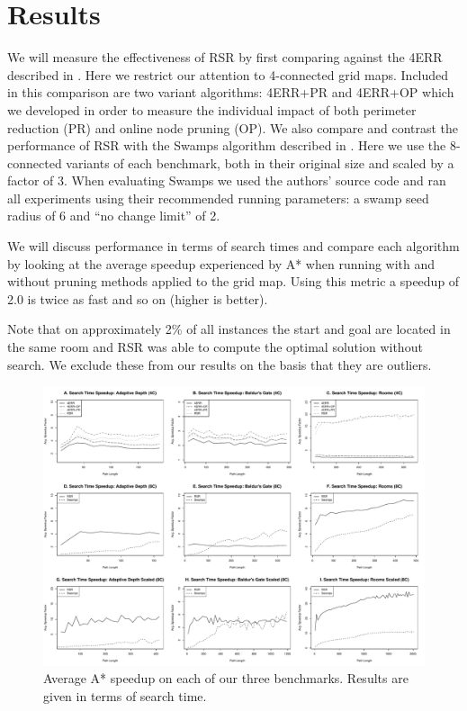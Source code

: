 \section{Results}
\label{sec-results}
We will measure the effectiveness of RSR by first comparing against the 4ERR
described in \cite{harabor10}. Here we restrict our attention to 4-connected
grid maps. Included in this comparison are two variant algorithms: 4ERR+PR and 
4ERR+OP which we developed in order to measure the individual impact of both
perimeter reduction (PR) and online node pruning (OP).
We also compare and contrast the performance of RSR
with the Swamps algorithm described in \cite{pochter10}.
Here we use the 8-connected variants of each benchmark, both in their original 
size and scaled by a factor of 3.
When evaluating Swamps we used the authors'
source code and ran all experiments using their recommended running parameters:
a swamp seed radius of 6 and ``no change limit'' of 2.  
\par 
We will discuss performance in terms of search times and compare each algorithm
by looking at the average speedup experienced by A* when running with and
without pruning methods applied to the grid map.  Using this metric a speedup of
2.0 is twice as fast and so on (higher is better).
\par
Note that on approximately 2\% of all instances the start and goal are located 
in the same room and RSR was able to compute the optimal solution without
search.
We exclude these from our results on the basis that they are 
outliers. 
\begin{figure}[t]
       \begin{center}
                       \includegraphics[width=1.90\columnwidth, trim = 10mm 10mm 10mm 0mm]{diagrams/speedup.pdf}
       \end{center}
       \caption{Average A* speedup on each of our three benchmarks. 
		Results are given in terms of search time.}
\label{fig-speedup}
\end{figure}

